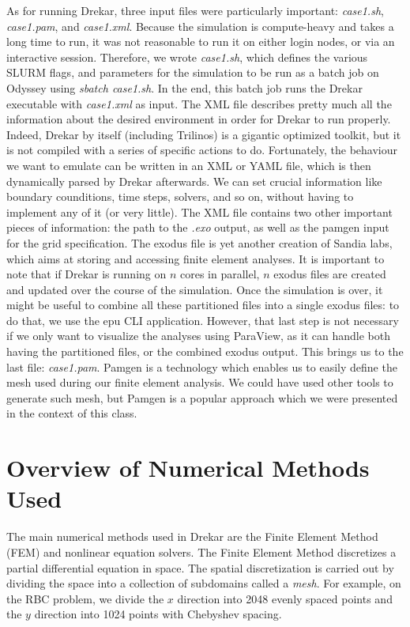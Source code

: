 \documentclass[11pt]{article} %
\begin{document}
As for running Drekar, three input files were particularly important: \textit{case1.sh}, \textit{case1.pam}, and \textit{case1.xml}. 
Because the simulation is compute-heavy and takes a long time to run, it was not reasonable to run it on 
either login nodes, or via an interactive session. 
Therefore, we wrote \textit{case1.sh}, which defines the various SLURM flags, and parameters for the simulation
to be run as a batch job on Odyssey using \textit{sbatch case1.sh}. 
In the end, this batch job runs the Drekar executable with \textit{case1.xml} as input. 
The XML file describes pretty much all the information about the desired environment in order for Drekar to run properly. 
Indeed, Drekar by itself (including Trilinos) is a gigantic optimized toolkit, but it is not compiled with a series of specific actions to do. 
Fortunately, the behaviour we want to emulate can be written in an XML or YAML file, which is then dynamically parsed by Drekar afterwards. 
We can set crucial information like boundary counditions, time steps, solvers, and so on, without having to implement any of it (or very little). 
The XML file contains two other important pieces of information: the path to the \textit{.exo} output, 
as well as the pamgen input for the grid specification. 
The exodus file is yet another creation of Sandia labs, which aims at storing and accessing finite element analyses.\cite{exo} 
It is important to note that if Drekar is running on $n$ cores in parallel, $n$ exodus files are created 
and updated over the course of the simulation. 
Once the simulation is over, it might be useful to combine all these partitioned files into a single exodus files: 
to do that, we use the epu CLI application. However, that last step is not necessary if we only want to visualize
 the analyses using ParaView, as it can handle both having the partitioned files, or the combined exodus output.  
This brings us to the last file: \textit{case1.pam}.  
Pamgen is a technology which enables us to easily define the mesh used during our finite element analysis.\cite{pam} 
We could have used other tools to generate such mesh, but Pamgen is a popular approach which we were presented in the context of this class.


\section{Overview of Numerical Methods Used}
The main numerical methods used in Drekar are the Finite Element Method (FEM)
and nonlinear equation solvers.
The Finite Element Method discretizes a partial differential equation in space.
The spatial discretization is carried out by dividing the space into a collection of
subdomains called a \textit{mesh}.  
For example, on the RBC problem, we divide the $x$ direction into 2048 evenly spaced
points and the $y$ direction into 1024 points with Chebyshev spacing.
\end{document}

